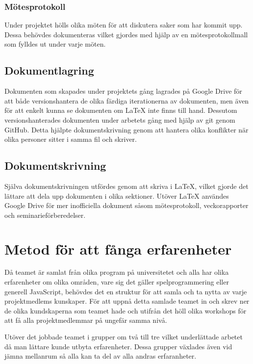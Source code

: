 \subsubsection*{Mötesprotokoll}
Under projektet hölls olika möten för att diskutera saker som har kommit upp. Dessa behövdes dokumenteras vilket gjordes med hjälp av en mötesprotokollmall som fylldes ut under varje möten.

\subsection{Dokumentlagring}
Dokumenten som skapades under projektets gång lagrades på Google Drive för att både versionshantera de olika färdiga iterationerna av dokumenten, men även för att enkelt kunna se dokumenten om LaTeX inte finns till hand. Dessutom versionshanterades dokumenten under arbetets gång med hjälp av git genom GitHub. Detta hjälpte dokumentskrivning genom att hantera olika konflikter när olika personer sitter i samma fil och skriver.

\subsection{Dokumentskrivning}
Själva dokumentskrivningen utfördes genom att skriva i LaTeX, vilket gjorde det lättare att dela upp dokumenten i olika sektioner. Utöver LaTeX användes Google Drive för mer inofficiella dokument såsom mötesprotokoll, veckorapporter och seminarieförberedelser.

\section{Metod för att fånga erfarenheter}
Då teamet är samlat från olika program på universitetet och alla har olika erfarenheter om olika områden, vare sig det gäller spelprogrammering eller generell JavaScript, behövdes det en struktur för att samla och ta nytta av varje projektmedlems kunskaper. För att uppnå detta samlade teamet in och skrev ner de olika kundskaperna som teamet hade och utifrån det höll olika workshops för att få alla projektmedlemmar på ungefär samma nivå.

Utöver det jobbade teamet i grupper om två till tre vilket underlättade arbetet då man lättare kunde utbyta erfarenheter. Dessa grupper växlades även vid jämna mellanrum så alla kan ta del av alla andras erfaranheter.
